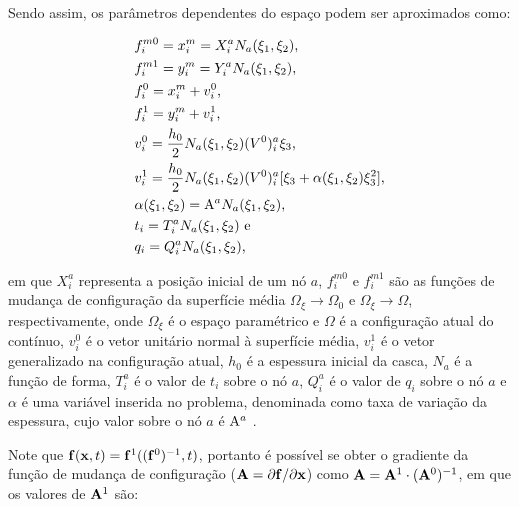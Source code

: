 \documentclass[_ArquivoPrincipal.tex]{subfiles}
\begin{document}
Sendo assim, os parâmetros dependentes do espaço podem ser aproximados como:

\begin{subequations}
    \begin{align}
         & f_i^{m0}=x_i^m=X_i^aN_a(\xi_1,\xi_2)\text{,}                                            \\
         & f_i^{m1}=y_i^m=Y_i^aN_a(\xi_1,\xi_2)\text{,}                                            \\
         & f_i^0=x_i^m+v_i^0\text{,}                                                               \\
         & f_i^1=y_i^m+v_i^1\text{,}                                                               \\
         & v_i^0=\frac{h_0}{2}N_ a(\xi_1,\xi_2)(V^0)_i^a\xi_3\text{,}                              \\
         & v_i^1=\frac{h_0}{2}N_ a(\xi_1,\xi_2)(V^0)_i^a[\xi_3+\alpha(\xi_1,\xi_2)\xi_3^2]\text{,} \\
         & \alpha(\xi_1,\xi_2)=\mathrm{A}^aN_a(\xi_1,\xi_2)\text{,}                                    \\
         & t_i=T_i^aN_a(\xi_1,\xi_2)\text{ e}                                                      \\
         & q_i=Q_i^aN_a(\xi_1,\xi_2)\text{,}
    \end{align}
\end{subequations}

\noindent em que $X_i^a$ representa a posição inicial de um nó $a$, $f_i^{m0}$ e $f_i^{m1}$ são as funções de mudança de configuração da superfície média $\Omega_\xi\to\Omega_0$ e $\Omega_\xi\to\Omega$, respectivamente, onde $\Omega_\xi$ é o espaço paramétrico e $\Omega$ é a configuração atual do contínuo, $v_i^0$ é o vetor unitário normal à superfície média, $v_i^1$ é o vetor generalizado na configuração atual, $h_0$ é a espessura inicial da casca, $N_a$ é a função de forma, $T_i^a$ é o valor de $t_i$ sobre o nó $a$, $Q_i^a$ é o valor de $q_i$ sobre o nó $a$ e $\alpha$ é uma variável inserida no problema, denominada como taxa de variação da espessura, cujo valor sobre o nó $a$ é $\mathrm{A}^a$ \cite{sanches2013unconstrained,sanches2014fluid}.

Note que $\mathbf{f}(\mathbf{x},t)=\mathbf{f}^1((\mathbf{f}^0)^{-1},t)$, portanto é possível se obter o gradiente da função de mudança de configuração ($\mathbf{A}=\partial\mathbf{f}/\partial\mathbf{x}$) como $\mathbf{A}=\mathbf{A}^1\cdot(\mathbf{A}^0)^{-1}$, em que os valores de $\mathbf{A}^1$ são:
\end{document}
